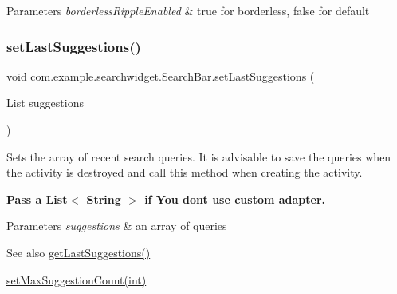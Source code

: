 \begin{DoxyParams}{Parameters}
{\em borderless\+Ripple\+Enabled} & true for borderless, false for default \\
\hline
\end{DoxyParams}
\mbox{\label{classcom_1_1example_1_1searchwidget_1_1_search_bar_a36b0bcb2dd221d8cba1b64955a51b597}} 
\subsubsection{\texorpdfstring{setLastSuggestions()}{setLastSuggestions()}}
{\footnotesize\ttfamily void com.\+example.\+searchwidget.\+Search\+Bar.\+set\+Last\+Suggestions (\begin{DoxyParamCaption}\item[{List}]{suggestions }\end{DoxyParamCaption})}

Sets the array of recent search queries. It is advisable to save the queries when the activity is destroyed and call this method when creating the activity. 

{\bfseries{Pass a List$<$ String $>$ if You don\textquotesingle{}t use custom adapter.}}


\begin{DoxyParams}{Parameters}
{\em suggestions} & an array of queries \\
\hline
\end{DoxyParams}
\begin{DoxySeeAlso}{See also}
\mbox{\hyperlink{classcom_1_1example_1_1searchwidget_1_1_search_bar_a29fff6f8fe5011b1854e4fd4a55ea65f}{get\+Last\+Suggestions()}} 

\mbox{\hyperlink{classcom_1_1example_1_1searchwidget_1_1_search_bar_a0f4236bdaf89946d9bdc0eb982cb7cce}{set\+Max\+Suggestion\+Count(int)}} 
\end{DoxySeeAlso}
\mbox{\label{classcom_1_1example_1_1searchwidget_1_1_search_bar_a0f4236bdaf89946d9bdc0eb982cb7cce}} 
